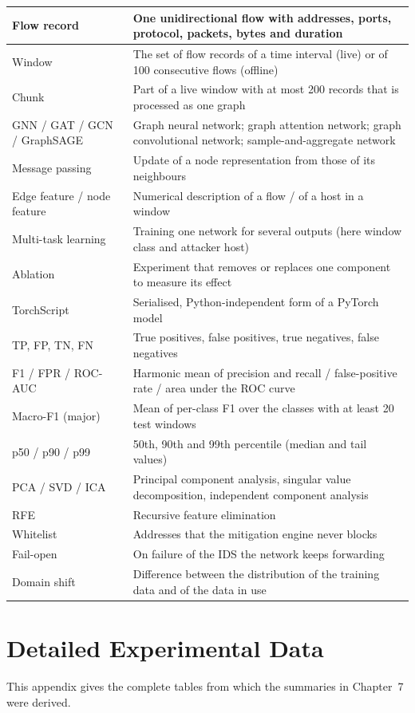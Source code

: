 \begin{appendices}
\begin{longtable}{|p{3.2cm}|p{10.8cm}|}
Flow record & One unidirectional flow with addresses, ports, protocol, packets, bytes and duration \\ \hline
Window & The set of flow records of a time interval (live) or of 100 consecutive flows (offline) \\ \hline
Chunk & Part of a live window with at most 200 records that is processed as one graph \\ \hline
GNN / GAT / GCN / GraphSAGE & Graph neural network; graph attention network; graph convolutional network; sample-and-aggregate network \\ \hline
Message passing & Update of a node representation from those of its neighbours \\ \hline
Edge feature / node feature & Numerical description of a flow / of a host in a window \\ \hline
Multi-task learning & Training one network for several outputs (here window class and attacker host) \\ \hline
Ablation & Experiment that removes or replaces one component to measure its effect \\ \hline
TorchScript & Serialised, Python-independent form of a PyTorch model \\ \hline
TP, FP, TN, FN & True positives, false positives, true negatives, false negatives \\ \hline
F1 / FPR / ROC-AUC & Harmonic mean of precision and recall / false-positive rate / area under the ROC curve \\ \hline
Macro-F1 (major) & Mean of per-class F1 over the classes with at least 20 test windows \\ \hline
p50 / p90 / p99 & 50th, 90th and 99th percentile (median and tail values) \\ \hline
PCA / SVD / ICA & Principal component analysis, singular value decomposition, independent component analysis \\ \hline
RFE & Recursive feature elimination \\ \hline
Whitelist & Addresses that the mitigation engine never blocks \\ \hline
Fail-open & On failure of the IDS the network keeps forwarding \\ \hline
Domain shift & Difference between the distribution of the training data and of the data in use \\ \hline
\end{longtable}


\chapter{Detailed Experimental Data}
This appendix gives the complete tables from which the summaries in Chapter~7 were derived.


\end{appendices}

